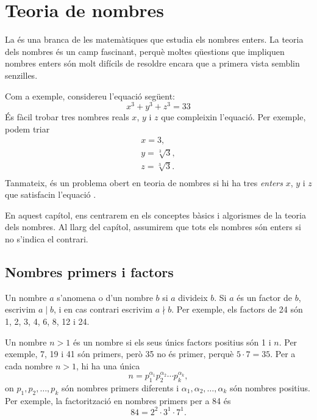 \chapter{Teoria de nombres}


La  és una branca de les matemàtiques que estudia
els nombres enters. La teoria dels nombres és un camp fascinant,
perquè moltes qüestions que impliquen nombres enters són molt difícils
de resoldre encara que a primera vista semblin senzilles.

Com a exemple, considereu l'equació següent:
\[x^3 + y^3 + z^3 = 33\]
És fàcil trobar tres nombres reals $x$, $y$ i $z$ que compleixin
l'equació. Per exemple, podem triar
\[
\begin{array}{lcl}
x = 3, \\
y = \sqrt[3]{3}, \\
z = \sqrt[3]{3}.\\
\end{array}
\]
Tanmateix, és un problema obert en teoria de nombres si hi ha tres
\emph{enters} $x$, $y$ i $z$ que satisfacin l'equació \cite{bec07}.

En aquest capítol, ens centrarem en els conceptes bàsics i algorismes
de la teoria dels nombres. Al llarg del capítol, assumirem que tots
els nombres són enters si no s'indica el contrari.

\section{Nombres primers i factors}

  

Un nombre $a$ s'anomena  o  d'un nombre $b$
si $a$ divideix $b$. Si $a$ és un factor de $b$, escrivim $a \mid b$,
i en cas contrari escrivim $a \nmid b$. Per exemple, els factors de 24
són 1, 2, 3, 4, 6, 8, 12 i 24.

 

Un nombre $n>1$ és un nombre  si els seus únics factors
positius són 1 i $n$. Per exemple, 7, 19 i 41 són primers, però 35 no
és primer, perquè $5 \cdot 7 = 35$. Per a cada nombre $n>1$, hi ha una
 única
\[ n = p_1^{\alpha_1} p_2^{\alpha_2} \cdots p_k^{\alpha_k},\]
on $p_1,p_2,\ldots,p_k$ són nombres primers diferents i
$\alpha_1,\alpha_2,\ldots,\alpha_k$ són nombres positius. Per exemple,
la factorització en nombres primers per a 84 és
\[84 = 2^2 \cdot 3^1 \cdot 7^1.\]


